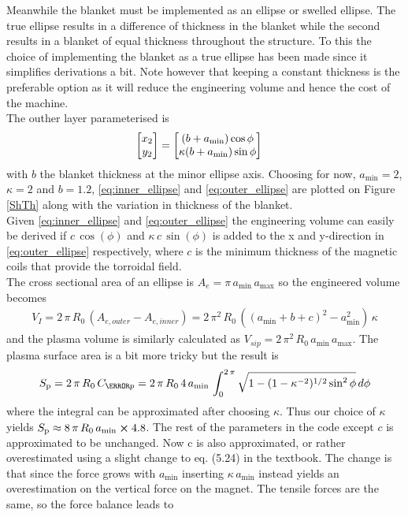 Meanwhile the blanket must be implemented as an ellipse or swelled ellipse. The true ellipse results in a difference of thickness in the blanket while the second results in a blanket of equal thickness throughout the structure. To this the choice of implementing the blanket as a true ellipse has been made since it simplifies derivations a bit. Note however that keeping a constant thickness is the preferable option as it will reduce the engineering volume and hence the cost of the machine.\\
The outher layer parameterised is
\begin{align}
	\mqty[x_2 \\y_2] &= \mqty[\pqty{b+a_{\min}}\cos{\phi}\\\kappa \pqty{b+a_{\min}}\sin{\phi}]
	\label{eq:outer_ellipse}
\end{align}
with $b$ the blanket thickness at the minor ellipse axis. Choosing for now, $a_{\min}=2$, $\kappa=2$ and $b=1.2$, \ref{eq:inner_ellipse} and \ref{eq:outer_ellipse} are plotted on Figure \ref{ShTh} along with the variation in thickness of the blanket. \\
Given \ref{eq:inner_ellipse} and \ref{eq:outer_ellipse} the engineering volume can easily be derived if $c\,\cos(\phi)$ and $\kappa\, c\,\sin(\phi)$ is added to the x and y-direction in \ref{eq:outer_ellipse} respectively, where $c$ is the minimum thickness of the magnetic coils that provide the torroidal field. \\
The cross sectional area of an ellipse is $A_{\si{e}}=\pi\, a_{\min}\, a_{\max}$ so the engineered volume becomes
\begin{align}
	V_{\si{I}}=2\,\pi\, R_{0}\,(A_{\si{e,outer}}-A_{\si{e,inner}})=2\,\pi^{2}\, R_{0}\,\left(\left(a_{\min}+b+c\right)^{2}-a_{\min}^{2}\right)\,\kappa
	\label{eq:engineered_volume}
\end{align}
and the plasma volume is similarly calculated as $V_{si{p}}=2\,\pi^2\, R_{0}\, a_{\min}\, a_{\max}$. The plasma surface area is a bit more tricky but the result is
\begin{align}
	S_{\si{p}}=2\,\pi\, R_{0}\, C_{\s{p}}=2\,\pi\, R_{0}\, 4\, a_{\min}\,\int_{0}^{2\,\pi}\sqrt{1-(1-\kappa^{-2})^{1/2}\sin^{2}{\phi}} \, d\si{\phi}
\end{align}
where the integral can be approximated after choosing $\kappa$. Thus our choice of $\kappa$ yields $S_{\si{p}}\approx 8\,\pi\, R_{0}\,a_{\min}\cross 4.8$. The rest of the parameters in the code except $c$ is approximated to be unchanged. Now c is also approximated, or rather overestimated using a slight change to eq. (5.24) in the textbook. The change is that since the force grows with $a_{\min}$ inserting $\kappa\, a_{\min}$ instead yields an overestimation on the vertical force on the magnet. The tensile forces are the same, so the force balance leads to

